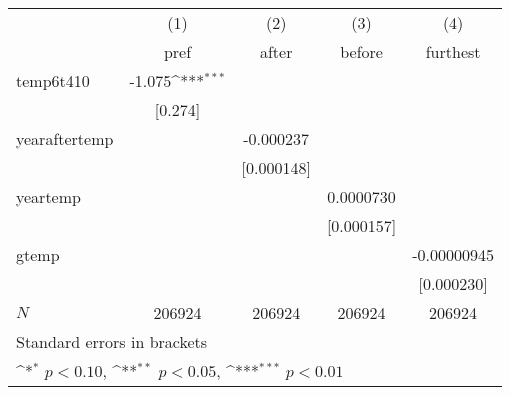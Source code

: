 {
\def\sym#1{\ifmmode^{#1}\else\(^{#1}\)\fi}
\begin{tabular}{l*{4}{c}}
\hline\hline
            &\multicolumn{1}{c}{(1)}&\multicolumn{1}{c}{(2)}&\multicolumn{1}{c}{(3)}&\multicolumn{1}{c}{(4)}\\
            &\multicolumn{1}{c}{pref}&\multicolumn{1}{c}{after}&\multicolumn{1}{c}{before}&\multicolumn{1}{c}{furthest}\\
\hline
temp6t410   &      -1.075\sym{***}&                     &                     &                     \\
            &     [0.274]         &                     &                     &                     \\
[1em]
yearaftertemp&                     &   -0.000237         &                     &                     \\
            &                     &  [0.000148]         &                     &                     \\
[1em]
yeartemp    &                     &                     &   0.0000730         &                     \\
            &                     &                     &  [0.000157]         &                     \\
[1em]
gtemp       &                     &                     &                     & -0.00000945         \\
            &                     &                     &                     &  [0.000230]         \\
\hline
\(N\)       &      206924         &      206924         &      206924         &      206924         \\
\hline\hline
\multicolumn{5}{l}{\footnotesize Standard errors in brackets}\\
\multicolumn{5}{l}{\footnotesize \sym{*} \(p<0.10\), \sym{**} \(p<0.05\), \sym{***} \(p<0.01\)}\\
\end{tabular}
}

